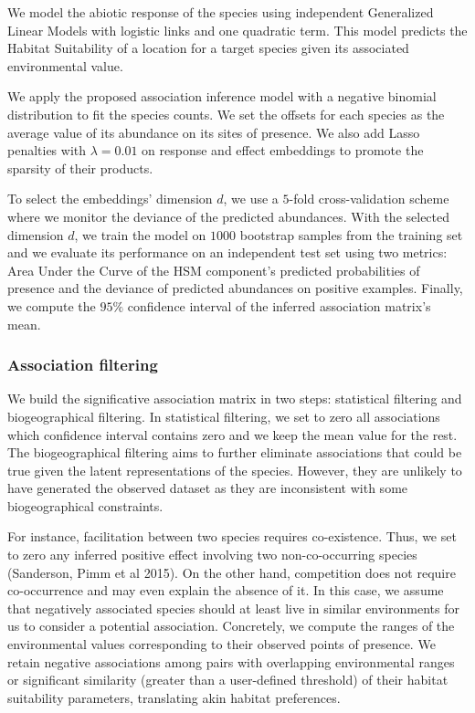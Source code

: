 \documentclass[]{article}
\begin{document}
We model the abiotic response of the species using independent Generalized Linear Models with logistic links and one quadratic term. This model predicts the Habitat Suitability of a location for a target species given its associated environmental value. 

We apply the proposed association inference model with a negative binomial distribution to fit the species counts. We set the offsets for each species as the average value of its abundance on its sites of presence. We also add Lasso penalties with $\lambda=0.01$ on response and effect embeddings to promote the sparsity of their products. 

To select the embeddings' dimension $d$, we use a $5$-fold cross-validation scheme where we monitor the deviance of the predicted abundances. With the selected dimension $d$, we train the model on $1000$ bootstrap samples from the training set and we evaluate its performance on an independent test set using two metrics: Area Under the Curve of the HSM component's predicted probabilities of presence and the deviance of predicted abundances on positive examples. Finally, we compute the $95\%$ confidence interval of the inferred association matrix's mean. 

\subsubsection{Association filtering}
We build the significative association matrix in two steps: statistical filtering and biogeographical filtering. In statistical filtering, we set to zero all associations which confidence interval contains zero and we keep the mean value for the rest. The biogeographical filtering aims to further eliminate associations that could be true given the latent representations of the species. However, they are unlikely to have generated the observed dataset as they are inconsistent with some biogeographical constraints.

For instance, facilitation between two species requires co-existence. Thus, we set to zero any inferred positive effect involving two non-co-occurring species (Sanderson, Pimm et al 2015). On the other hand, competition does not require co-occurrence and may even explain the absence of it. In this case, we assume that negatively associated species should at least live in similar environments for us to consider a potential association. Concretely, we compute the ranges of the environmental values corresponding to their observed points of presence. We retain negative associations among pairs with overlapping environmental ranges or significant similarity (greater than a user-defined threshold) of their habitat suitability parameters, translating akin habitat preferences. 
\end{document}
